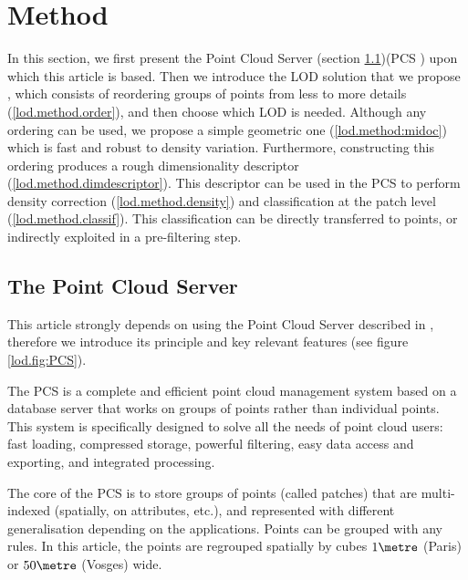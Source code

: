 

\section{Method}
	\label{lod.sec:method}
	
	In this section, we first present the Point Cloud Server (section \ref{lod.method.PCS})(PCS \cite{Cura2015})
	upon which this article is based. Then we introduce the LOD solution that we propose 
	, which consists of reordering groups of points from less to more details (\ref{lod.method.order}), and then choose which LOD is needed.
	Although any ordering can be used, we propose a simple geometric one (\ref{lod.method:midoc}) which is fast and robust to density variation. 
	Furthermore, constructing this ordering produces a rough dimensionality descriptor (\ref{lod.method.dimdescriptor}). 
	This descriptor can be used in the PCS to perform density correction (\ref{lod.method.density}) and classification at the patch level (\ref{lod.method.classif}). This classification can be directly transferred to points, or indirectly exploited in a pre-filtering step.
	
	\subsection{The Point Cloud Server}
	\label{lod.method.PCS}
		
		This article strongly depends on using the Point Cloud Server described in \cite{Cura2015},
		therefore we introduce its principle and key relevant features (see figure \ref{lod.fig:PCS}).
		
		The PCS is a complete and efficient point cloud management system based on a database server that works on groups of points rather than individual points.
		This system is specifically designed to solve all the needs of point cloud users:
		fast loading, compressed storage, powerful filtering, easy data access and exporting, and integrated processing.
		
		The core of the PCS is to store groups of points (called patches) that are multi-indexed (spatially, on attributes, etc.), and represented with different generalisation depending on the applications.
		Points can be grouped with any rules.
		In this article, the points are regrouped spatially by cubes $1 \metre$ (Paris) or $50 \metre$ (Vosges) wide.
		
